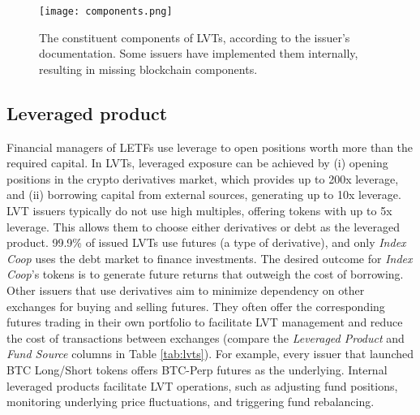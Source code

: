\begin{figure}[t]
	\centering
	\texttt{[image: components.png]}
	\caption[LVT constituent components]{The constituent components of LVTs, according to the issuer's documentation. Some issuers have implemented them internally, resulting in missing blockchain components.}
	\label{fig:components}
\end{figure}

\subsection{Leveraged product}\label{subsec:leveragedproduct}
Financial managers of LETFs use leverage to open positions worth more than the required capital. In LVTs, leveraged exposure can be achieved by (i) opening positions in the crypto derivatives market, which provides up to 200x leverage, and (ii) borrowing capital from external sources, generating up to 10x leverage. LVT issuers typically do not use high multiples, offering tokens with up to 5x leverage. This allows them to choose either derivatives or debt as the leveraged product. 99.9\% of issued LVTs use futures (a type of derivative), and only \textsl{Index Coop} uses the debt market to finance investments. The desired outcome for \textsl{Index Coop}'s tokens is to generate future returns that outweigh the cost of borrowing. Other issuers that use derivatives aim to minimize dependency on other exchanges for buying and selling futures. They often offer the corresponding futures trading in their own portfolio to facilitate LVT management and reduce the cost of transactions between exchanges (compare the \textsl{Leveraged Product} and \textsl{Fund Source} columns in Table \ref{tab:lvts}). For example, every issuer that launched BTC Long/Short tokens offers BTC-Perp futures as the underlying. Internal leveraged products facilitate LVT operations, such as adjusting fund positions, monitoring underlying price fluctuations, and triggering fund rebalancing.

